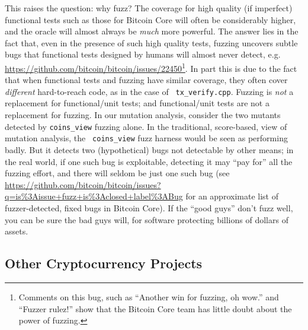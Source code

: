 This raises the question:  why fuzz?  The coverage for high quality
(if imperfect) functional tests such as those for Bitcoin Core will
often be considerably
higher, and the oracle will almost always be \emph{much} more powerful.  The answer lies in the
fact that, even in the presence of such high quality tests, fuzzing
uncovers subtle bugs that functional tests designed by humans will
almost never detect,
e.g. \url{https://github.com/bitcoin/bitcoin/issues/22450}\footnote{Comments
  on this bug, such as ``Another win for fuzzing, oh wow.'' and
  ``Fuzzer rulez!'' show that the Bitcoin Core team has little doubt
  about the power of fuzzing.}.  In part this is due to the fact that
when functional tests and fuzzing have similar coverage, they often
cover \emph{different} hard-to-reach code, as in the case of {\tt
  tx\_verify.cpp}.  Fuzzing is \emph{not} a replacement
for functional/unit tests; and functional/unit tests are not a
replacement for fuzzing.  In our mutation analysis, consider the two
mutants detected by {\tt coins\_view} fuzzing alone.  In the
traditional, score-based, view of mutation analysis, the {\tt
  coins\_view} fuzz harness would be seen as performing badly.  But it
detects two (hypothetical) bugs not detectable by other means; in the
real world, if one such bug is exploitable, detecting it may ``pay
for'' all the fuzzing effort, and there will seldom be just one such
bug (see
\url{https://github.com/bitcoin/bitcoin/issues?q=is\%3Aissue+fuzz+is\%3Aclosed+label\%3ABug}
for an approximate list of fuzzer-detected, fixed bugs in Bitcoin
Core).  If the ``good guys'' don't fuzz well, you can be sure the bad
guys will, for software protecting billions of dollars of assets.

\subsection{Other Cryptocurrency Projects}


